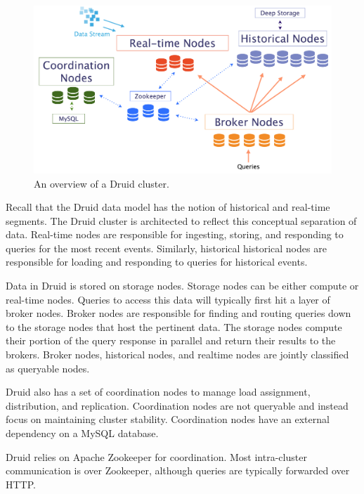 \documentclass{vldb}
\begin{document}
\begin{figure}
\centering
\includegraphics[width = 4.5in]{druid_cluster}
\caption{An overview of a Druid cluster.}
\label{fig:druid_cluster}
\end{figure}

Recall that the Druid data model has the notion of historical and real-time segments. The Druid cluster is architected to reflect this
conceptual separation of data. Real-time nodes are responsible for
ingesting, storing, and responding to queries for the most recent
events. Similarly, historical historical nodes are responsible for
loading and responding to queries for historical events.

Data in Druid is stored on storage nodes. Storage nodes can be either
compute or real-time nodes.  Queries to access this data will
typically first hit a layer of broker nodes. Broker nodes are
responsible for finding and routing queries down to the storage nodes
that host the pertinent data. The storage nodes compute their portion
of the query response in parallel and return their results to the
brokers. Broker nodes, historical nodes, and realtime nodes are jointly
classified as queryable nodes.

Druid also has a set of coordination nodes to manage load assignment,
distribution, and replication. Coordination nodes are not queryable
and instead focus on maintaining cluster stability. Coordination nodes
have an external dependency on a MySQL database.

Druid relies on Apache Zookeeper \cite{hunt2010zookeeper} 
for coordination. Most intra-cluster communication is over Zookeeper, although
queries are typically forwarded over HTTP.
\end{document}
